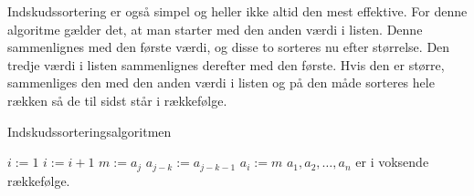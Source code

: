 Indskudssortering er også simpel og heller ikke altid den mest effektive. For denne algoritme gælder det, at man starter med den anden værdi i listen. Denne sammenlignes med den første værdi, og disse to sorteres nu efter størrelse. Den tredje værdi i listen sammenlignes derefter med den første. Hvis den er større, sammenliges den med den anden værdi i listen og på den måde sorteres hele rækken så de til sidst står i rækkefølge.

\begin{algorithm}[H]
\caption{Indskudssorteringsalgoritmen}
\begin{algorithmic}[1]

\EndProcedure
{}
	\State $i:=1$
    		\State $i:=i+1$
    	\EndWhile
    	\State $m:=a_{j}$
    		\State $a_{j-k}:=a_{j-k-1}$
    	\EndFor
    	\State $a_{i}:=m$
\EndFor
\State $a_{1},a_{2},\dotsc,a_{n}$ er i voksende rækkefølge. 

\end{algorithmic}
\end{algorithm}

